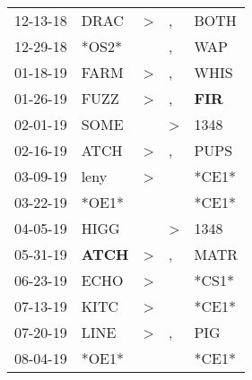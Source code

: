 \begin{supertabular}{p{0.07\textwidth}p{0.06\textwidth}p{0.02\textwidth}p{0.02\textwidth}p{0.06\textwidth}}
          12-13-18\textsuperscript{} &           DRAC\textsuperscript{} &     \textgreater &                , &           BOTH\textsuperscript{} \\
          12-29-18\textsuperscript{} &                            *OS2* &                  &                , &            WAP\textsuperscript{} \\
          01-18-19\textsuperscript{} &           FARM\textsuperscript{} &     \textgreater &                , &           WHIS\textsuperscript{} \\
          01-26-19\textsuperscript{} &           FUZZ\textsuperscript{} &     \textgreater &                , &   \textbf{FIR\textsuperscript{}} \\
          02-01-19\textsuperscript{} &           SOME\textsuperscript{} &                  &     \textgreater &           1348\textsuperscript{} \\
          02-16-19\textsuperscript{} &           ATCH\textsuperscript{} &     \textgreater &                , &           PUPS\textsuperscript{} \\
          03-09-19\textsuperscript{} &           leny\textsuperscript{} &     \textgreater &                  &                            *CE1* \\
          03-22-19\textsuperscript{} &                            *OE1* &                  &                  &                            *CE1* \\
          04-05-19\textsuperscript{} &           HIGG\textsuperscript{} &                  &     \textgreater &           1348\textsuperscript{} \\
          05-31-19\textsuperscript{} &  \textbf{ATCH\textsuperscript{}} &     \textgreater &                , &           MATR\textsuperscript{} \\
          06-23-19\textsuperscript{} &           ECHO\textsuperscript{} &     \textgreater &                  &                            *CS1* \\
          07-13-19\textsuperscript{} &           KITC\textsuperscript{} &     \textgreater &                  &                            *CE1* \\
          07-20-19\textsuperscript{} &           LINE\textsuperscript{} &     \textgreater &                , &            PIG\textsuperscript{} \\
          08-04-19\textsuperscript{} &                            *OE1* &                  &                  &                            *CE1* \\

\end{supertabular}
